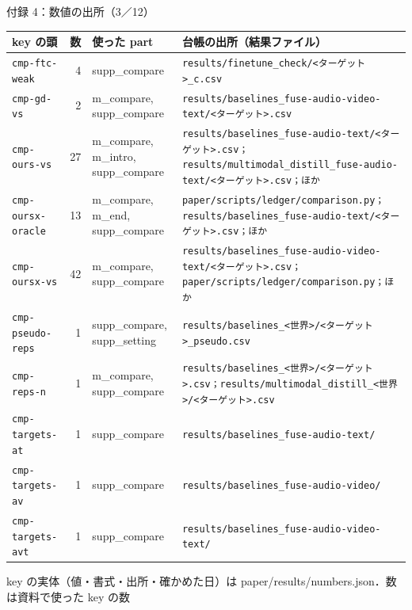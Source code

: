 \begin{frame}{付録 4：数値の出所（3／12）}
  \vspace{-0.3em}\centering\tiny\renewcommand{\arraystretch}{1.0}
  \begin{tabularx}{\textwidth}{@{}l r l X@{}}
    \toprule key の頭 & 数 & 使った part & 台帳の出所（結果ファイル） \\ \midrule
    \texttt{cmp-ftc-weak} & 4 & supp\_compare & \texttt{results/\allowbreak{}finetune\_\allowbreak{}check/\allowbreak{}<ターゲット>\_\allowbreak{}c.csv} \\
    \texttt{cmp-gd-vs} & 2 & m\_compare, supp\_compare & \texttt{results/\allowbreak{}baselines\_\allowbreak{}fuse-audio-video-text/\allowbreak{}<ターゲット>.csv} \\
    \texttt{cmp-ours-vs} & 27 & m\_compare, m\_intro, supp\_compare & \texttt{results/\allowbreak{}baselines\_\allowbreak{}fuse-audio-text/\allowbreak{}<ターゲット>.csv；results/\allowbreak{}multimodal\_\allowbreak{}distill\_\allowbreak{}fuse-audio-text/\allowbreak{}<ターゲット>.csv；ほか} \\
    \texttt{cmp-oursx-oracle} & 13 & m\_compare, m\_end, supp\_compare & \texttt{paper/\allowbreak{}scripts/\allowbreak{}ledger/\allowbreak{}comparison.py；results/\allowbreak{}baselines\_\allowbreak{}fuse-audio-text/\allowbreak{}<ターゲット>.csv；ほか} \\
    \texttt{cmp-oursx-vs} & 42 & m\_compare, supp\_compare & \texttt{results/\allowbreak{}baselines\_\allowbreak{}fuse-audio-video-text/\allowbreak{}<ターゲット>.csv；paper/\allowbreak{}scripts/\allowbreak{}ledger/\allowbreak{}comparison.py；ほか} \\
    \texttt{cmp-pseudo-reps} & 1 & supp\_compare, supp\_setting & \texttt{results/\allowbreak{}baselines\_\allowbreak{}<世界>/\allowbreak{}<ターゲット>\_\allowbreak{}pseudo.csv} \\
    \texttt{cmp-reps-n} & 1 & m\_compare, supp\_compare & \texttt{results/\allowbreak{}baselines\_\allowbreak{}<世界>/\allowbreak{}<ターゲット>.csv；results/\allowbreak{}multimodal\_\allowbreak{}distill\_\allowbreak{}<世界>/\allowbreak{}<ターゲット>.csv} \\
    \texttt{cmp-targets-at} & 1 & supp\_compare & \texttt{results/\allowbreak{}baselines\_\allowbreak{}fuse-audio-text/\allowbreak{}} \\
    \texttt{cmp-targets-av} & 1 & supp\_compare & \texttt{results/\allowbreak{}baselines\_\allowbreak{}fuse-audio-video/\allowbreak{}} \\
    \texttt{cmp-targets-avt} & 1 & supp\_compare & \texttt{results/\allowbreak{}baselines\_\allowbreak{}fuse-audio-video-text/\allowbreak{}} \\
    \bottomrule
  \end{tabularx}\par
  {\raggedright\tiny key の実体（値・書式・出所・確かめた日）は paper/results/numbers.json．数は資料で使った key の数\par}
\end{frame}
